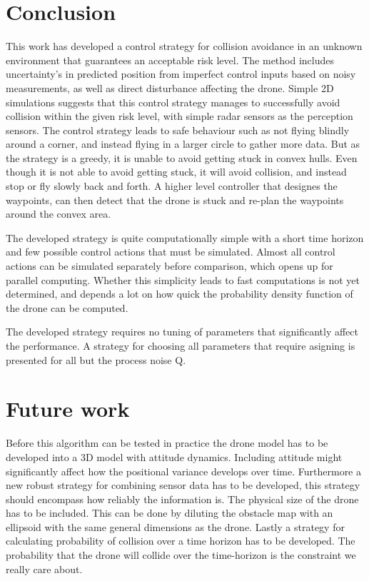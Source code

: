 \section{Conclusion}

This work has developed a control strategy for collision avoidance in an unknown environment that guarantees an acceptable risk level. The method includes uncertainty's in predicted position from imperfect control inputs based on noisy measurements, as well as direct disturbance affecting the drone. Simple 2D simulations suggests that this control strategy manages to successfully avoid collision within the given risk level, with simple radar sensors as the perception sensors. The control strategy leads to safe behaviour such as not flying blindly around a corner, and instead flying in a larger circle to gather more data. But as the strategy is a greedy, it is unable to avoid getting stuck in convex hulls. Even though it is not able to avoid getting stuck, it will avoid collision, and instead stop or fly slowly back and forth. A higher level controller that designes the waypoints, can then detect that the drone is stuck and re-plan the waypoints around the convex area.

The developed strategy is quite computationally simple with a short time horizon and few possible control actions that must be simulated. Almost all control actions can be simulated separately before comparison, which opens up for parallel computing. Whether this simplicity leads to fast computations is not yet determined, and depends a lot on how quick the probability density function of the drone can be computed. 

The developed strategy requires no tuning of parameters that significantly affect the performance. A strategy for choosing all parameters that require asigning is presented for all but the process noise Q. 


\section{Future work}

Before this algorithm can be tested in practice the drone model has to be developed into a 3D model with attitude dynamics. Including attitude might significantly affect how the positional variance develops over time. Furthermore a new robust strategy for combining sensor data has to be developed, this strategy should encompass how reliably the information is. The physical size of the drone has to be included. This can be done by diluting the obstacle map with an ellipsoid with the same general dimensions as the drone. Lastly a strategy for calculating probability of collision over a time horizon has to be developed. The probability that the drone will collide over the time-horizon is the constraint we really care about. 




